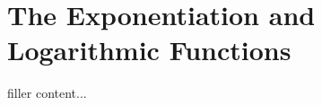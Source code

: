 \documentclass[../../templates/section]{subfiles}
\begin{document}
\section{The Exponentiation and Logarithmic Functions}\label{sec:the-exponentiation-and-logarithmic-functions}

filler content...
\end{document}
